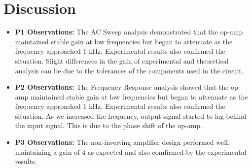 \chapter{Discussion}

\begin{itemize}
    \item \textbf{P1 Observations:} The AC Sweep analysis demonstrated that the op-amp maintained stable gain at low frequencies but began to attenuate as the frequency approached 1 kHz. Experimental results also confirmed the situation. Slight differences in the gain of experimental and theoretical analysis can be due to the tolerances of the components used in the circuit.
    \item \textbf{P2 Observations:} The Frequency Response analysis showed that the op-amp maintained stable gain at low frequencies but began to attenuate as the frequency approached 1 kHz. Experimental results also confirmed the situation. As we increased the frequency, output signal started to lag behind the input signal. This is due to the phase shift of the op-amp.
    \item \textbf{P3 Observations:} The non-inverting amplifier design performed well, maintaining a gain of 4 as expected and also comfirmed by the experimental results.
\end{itemize}
